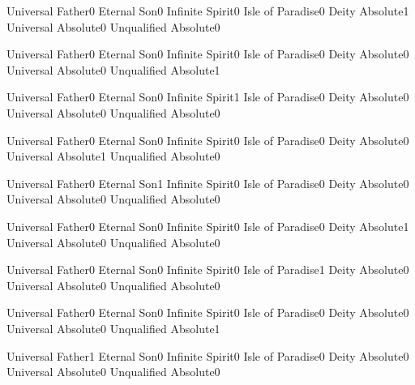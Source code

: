 {Universal Father}{0}
{Eternal Son}{0}
{Infinite Spirit}{0}
{Isle of Paradise}{0}
{Deity Absolute}{1}
{Universal Absolute}{0}
{Unqualified Absolute}{0}
\qstop

{Universal Father}{0}
{Eternal Son}{0}
{Infinite Spirit}{0}
{Isle of Paradise}{0}
{Deity Absolute}{0}
{Universal Absolute}{0}
{Unqualified Absolute}{1}
\qstop

{Universal Father}{0}
{Eternal Son}{0}
{Infinite Spirit}{1}
{Isle of Paradise}{0}
{Deity Absolute}{0}
{Universal Absolute}{0}
{Unqualified Absolute}{0}
\qstop

{Universal Father}{0}
{Eternal Son}{0}
{Infinite Spirit}{0}
{Isle of Paradise}{0}
{Deity Absolute}{0}
{Universal Absolute}{1}
{Unqualified Absolute}{0}
\qstop

{Universal Father}{0}
{Eternal Son}{1}
{Infinite Spirit}{0}
{Isle of Paradise}{0}
{Deity Absolute}{0}
{Universal Absolute}{0}
{Unqualified Absolute}{0}
\qstop

{Universal Father}{0}
{Eternal Son}{0}
{Infinite Spirit}{0}
{Isle of Paradise}{0}
{Deity Absolute}{1}
{Universal Absolute}{0}
{Unqualified Absolute}{0}
\qstop

{Universal Father}{0}
{Eternal Son}{0}
{Infinite Spirit}{0}
{Isle of Paradise}{1}
{Deity Absolute}{0}
{Universal Absolute}{0}
{Unqualified Absolute}{0}
\qstop

{Universal Father}{0}
{Eternal Son}{0}
{Infinite Spirit}{0}
{Isle of Paradise}{0}
{Deity Absolute}{0}
{Universal Absolute}{0}
{Unqualified Absolute}{1}
\qstop

{Universal Father}{1}
{Eternal Son}{0}
{Infinite Spirit}{0}
{Isle of Paradise}{0}
{Deity Absolute}{0}
{Universal Absolute}{0}
{Unqualified Absolute}{0}
\qstop

